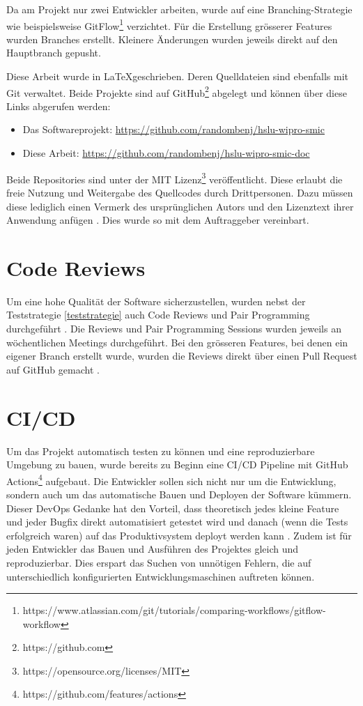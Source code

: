 Da am Projekt nur zwei Entwickler arbeiten,
wurde auf eine Branching-Strategie wie beispielsweise
GitFlow\footnote{https://www.atlassian.com/git/tutorials/comparing-workflows/gitflow-workflow} verzichtet.
Für die Erstellung grösserer Features wurden Branches erstellt.
Kleinere Änderungen wurden jeweils direkt auf den Hauptbranch gepusht.

Diese Arbeit wurde in \LaTeX geschrieben. Deren Quelldateien sind ebenfalls mit Git verwaltet.
Beide Projekte sind auf GitHub\footnote{https://github.com} abgelegt und können über diese Links abgerufen werden:

\begin{itemize}
      \item Das Softwareprojekt: \url{https://github.com/randombenj/hslu-wipro-smic}
      \item Diese Arbeit: \url{https://github.com/randombenj/hslu-wipro-smic-doc}
\end{itemize}

Beide Repositories sind unter der MIT Lizenz\footnote{https://opensource.org/licenses/MIT} veröffentlicht.
Diese erlaubt die freie Nutzung und Weitergabe des Quellcodes durch Drittpersonen.
Dazu müssen diese lediglich einen Vermerk des ursprünglichen Autors und den Lizenztext ihrer Anwendung anfügen \parencite{mit_licence}.
Dies wurde so mit dem Auftraggeber vereinbart.

\section{Code Reviews}

Um eine hohe Qualität der Software sicherzustellen, wurden nebst der Teststrategie \ref{teststrategie}
auch Code Reviews und Pair Programming durchgeführt \parencite{fu2017code}.
Die Reviews und Pair Programming Sessions wurden jeweils an wöchentlichen
Meetings durchgeführt.
Bei den grösseren Features, bei denen ein eigener Branch erstellt wurde, wurden die
Reviews direkt über einen Pull Request auf GitHub gemacht \parencite{github_flow_docs_2021}.

\section{\ac{CI/CD}}

Um das Projekt automatisch testen zu können und eine reproduzierbare Umgebung zu bauen,
wurde bereits zu Beginn eine \ac{CI/CD} Pipeline mit GitHub Actions\footnote{https://github.com/features/actions}
aufgebaut.
Die Entwickler sollen sich nicht nur um die Entwicklung, sondern auch um das automatische Bauen und Deployen der
Software kümmern. Dieser DevOps Gedanke hat den Vorteil, dass
theoretisch jedes kleine Feature und jeder Bugfix direkt automatisiert getestet
wird und danach (wenn die Tests erfolgreich waren) auf das Produktivsystem
deployt werden kann \parencite{what_is_devops}.
Zudem ist für jeden Entwickler das Bauen und Ausführen des Projektes gleich und
reproduzierbar. Dies erspart das Suchen von unnötigen Fehlern, die auf unterschiedlich
konfigurierten Entwicklungsmaschinen auftreten können.
